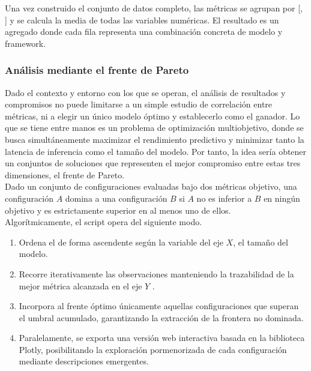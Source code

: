 \documentclass[a4paper,12pt,twoside,final]{book}
\begin{document}
Una vez construido el conjunto de datos completo, las métricas se agrupan por [, ] y se
calcula la media de todas las variables numéricas. El resultado es un  agregado donde cada fila
representa una combinación concreta de modelo y framework.

\subsubsection{Análisis mediante el frente de Pareto}
Dado el contexto y entorno con los que se operan, el análisis de resultados y compromisos no puede limitarse a un
simple estudio de correlación entre métricas, ni a elegir un único modelo óptimo y establecerlo como el ganador. Lo
que se tiene entre manos es un problema de optimización multiobjetivo, donde se busca simultáneamente maximizar el
rendimiento predictivo y minimizar tanto la latencia de inferencia como el tamaño del modelo. Por tanto, la idea sería
obtener un conjuntos de soluciones que representen el mejor compromiso entre estas tres dimensiones, el frente de
Pareto.\\

Dado un conjunto de configuraciones evaluadas bajo dos métricas objetivo, una configuración $A$ domina a una
configuración $B$ si $A$ no es inferior a $B$ en ningún objetivo y es estrictamente superior en al menos uno de ellos.\\

Algorítmicamente, el script opera del siguiente modo.
\begin{enumerate}
  \item Ordena el  de forma ascendente según la variable del eje $X$, el tamaño del modelo. 
  \item Recorre iterativamente las observaciones manteniendo la trazabilidad de la mejor métrica alcanzada en el eje
  $Y$ .
  \item Incorpora al frente óptimo únicamente aquellas configuraciones que superan el umbral  acumulado,
  garantizando la extracción de la frontera no dominada.
  \item Paralelamente, se exporta una versión web interactiva basada en la biblioteca Plotly, posibilitando la
  exploración pormenorizada de cada configuración mediante descripciones emergentes.
\end{enumerate}
\end{document}
